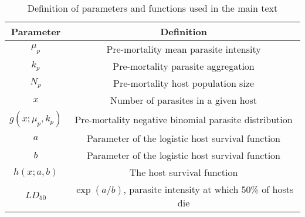 \documentclass[12pt, a4paper]{article}
\begin{document}
\begin{table}
    \centering
    \caption{Definition of parameters and functions used in the main text}
    \begin{tabular}{c c}
    \hline
    Parameter & Definition \\
    \hline\hline
    $\mu_p$ & Pre-mortality mean parasite intensity \\
    $k_p$   & Pre-mortality parasite aggregation \\
    $N_p$   & Pre-mortality host population size \\
    $x$     & Number of parasites in a given host \\
    $g(x; \mu_p, k_p)$ & Pre-mortality negative binomial parasite distribution \\
    $a$ & Parameter of the logistic host survival function \\
    $b$ & Parameter of the logistic host survival function \\
    $h(x; a, b)$ & The host survival function \\
    $LD_{50}$ & $\exp(a / b)$, parasite intensity at which 50\% of hosts die \\

    \end{tabular}
    \label{tab:params}
\end{table}
\end{document}
